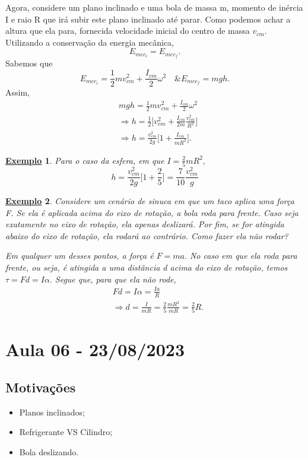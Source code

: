 \documentclass{article}
\newtheorem{example}{\underline{Exemplo}}
\begin{document}
  Agora, considere um plano inclinado e uma bola de massa m, momento de inércia I e raio R que irá subir este plano inclinado até parar. Como podemos achar a altura que ela para, 
fornecida velocidade inicial do centro de massa \(v_{cm}\). Utilizando a conservação da energia mecânica, 
  \[
    E_{mec_{i}} = E_{mec_{f}}.
  \]
  Sabemos que 
    \[
      E_{mec_{i}} = \frac{1}{2}mv_{cm}^{2} + \frac{I_{cm}}{2}\omega ^{2}\quad \& E_{mec_{f}} = mgh.
    \]
  Assim, 
  \begin{align*}
    &mgh = \frac{1}{2} mv_{cm}^{2} + \frac{I_{cm}}{2}\omega^{2}\\
    &\Rightarrow h = \frac{1}{2}\biggl[v_{cm}^{2} + \frac{I_{cm}}{2m}\frac{v_{cm}^{2}}{R^{2}}\biggr]\\
    &\Rightarrow h = \frac{v_{cm}^{2}}{2g}\biggl[1 + \frac{I_{cm}}{mR^{2}}\biggr].
  \end{align*}
 \begin{example}
   Para o caso da esfera, em que \(I = \frac{2}{5}mR^{2},\) 
     \[
       h = \frac{v_{cm}^{2}}{2g}\biggl[1 + \frac{2}{5}\biggr] = \frac{7}{10}\frac{v_{cm}^{2}}{g}
     \]
 \end{example}
\begin{example}
  Considere um cenário de sinuca em que um taco aplica uma força F. Se ela é aplicada acima do eixo de rotação, a bola roda para frente. Caso seja exatamente no eixo de rotação,
ela apenas deslizará. Por fim, se for atingida abaixo do eixo de rotação, ela rodará ao contrário. Como fazer ela não rodar?

  Em qualquer um desses pontos, a força é \(F=ma.\) No caso em que ela roda para frente, ou seja, é atingida a uma distância d acima do eixo de rotação,
temos \(\tau = Fd = I\alpha.\) Segue que, para que ela não rode, 
\begin{align*}
  & Fd = I\alpha = \frac{Ia}{R}\\
  &\Rightarrow d = \frac{I}{mR} = \frac{2}{5}\frac{mR^{2}}{mR} = \frac{2}{5}R.
\end{align*}
\end{example}
\newpage

\section{Aula 06 - 23/08/2023}
\subsection{Motivações}
\begin{itemize}
  \item Planos inclinados;
  \item Refrigerante VS Cilindro;
  \item Bola deslizando.
\end{itemize}
\end{document}
